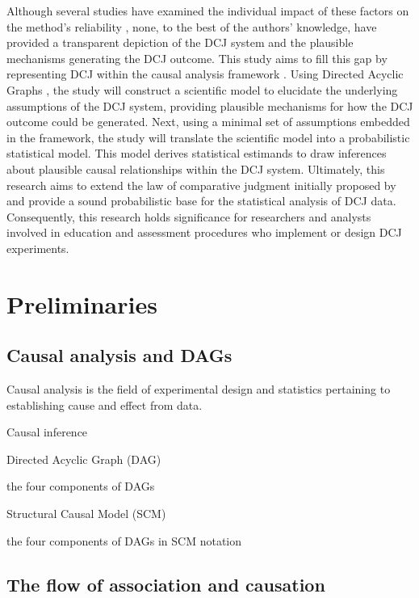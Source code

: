 \documentclass[
  authoryear,
  preprint,
  1p]{elsarticle}
\begin{document}
Although several studies have examined the individual impact of these
factors on the method's reliability
\citep{Bramley_2015, Pollitt_2012b, Bramley_et_al_2019, Verhavert_et_al_2019, Crompvoets_et_al_2022, vanDaal_et_al_2017, Gijsen_et_al_2021},
none, to the best of the authors' knowledge, have provided a transparent
depiction of the DCJ system and the plausible mechanisms generating the
DCJ outcome. This study aims to fill this gap by representing DCJ within
the causal analysis framework \citep{Pearl_2009, Pearl_et_al_2016}.
Using Directed Acyclic Graphs
\citep[DAG,][]{Gross_et_al_2018, Neal_2020}, the study will construct a
scientific model to elucidate the underlying assumptions of the DCJ
system, providing plausible mechanisms for how the DCJ outcome could be
generated. Next, using a minimal set of assumptions embedded in the
framework, the study will translate the scientific model into a
probabilistic statistical model. This model derives statistical
estimands to draw inferences about plausible causal relationships within
the DCJ system. Ultimately, this research aims to extend the law of
comparative judgment initially proposed by \citet{Thurstone_1927} and
provide a sound probabilistic base for the statistical analysis of DCJ
data. Consequently, this research holds significance for researchers and
analysts involved in education and assessment procedures who implement
or design DCJ experiments.

\section{Preliminaries}\label{sec-prelim}

\subsection{Causal analysis and DAGs}\label{sec-prelim-causal}

Causal analysis is the field of experimental design and statistics
pertaining to establishing cause and effect from data.

Causal inference

Directed Acyclic Graph (DAG)

the four components of DAGs

Structural Causal Model (SCM)

the four components of DAGs in SCM notation

\subsection{The flow of association and
causation}\label{sec-prelim-flow}
\end{document}

